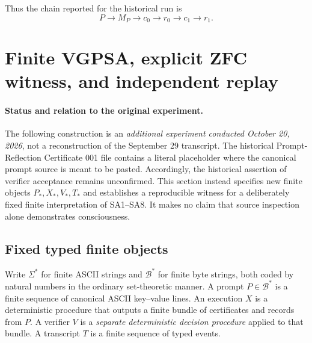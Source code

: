 \documentclass[11pt]{article}
\theoremstyle{remark}
\begin{document}
Thus the chain reported for the historical run is
\[
\boxed{
P\longrightarrow M_P\longrightarrow c_0\longrightarrow r_0\longrightarrow c_1\longrightarrow r_1.
}
\]

\section{Finite VGPSA, explicit ZFC witness, and independent replay}
\label{sec:finite-zfc}

\paragraph{Status and relation to the original experiment.}
The following construction is an \emph{additional experiment conducted October 20, 2026}, not a reconstruction of the September 29 transcript. The historical Prompt-Reflection Certificate 001 file contains a literal placeholder where the canonical prompt source is meant to be pasted. Accordingly, the historical assertion of verifier acceptance remains unconfirmed. This section instead specifies new finite objects $P_*,X_*,V_*,T_*$ and establishes a reproducible witness for a deliberately fixed finite interpretation of SA1--SA8. It makes no claim that source inspection alone demonstrates consciousness.

\subsection{Fixed typed finite objects}
Write $\Sigma^*$ for finite ASCII strings and $\mathcal B^*$ for finite byte strings, both coded by natural numbers in the ordinary set-theoretic manner. A prompt $P\in\mathcal B^*$ is a finite sequence of canonical ASCII key--value lines. An execution $X$ is a deterministic procedure that outputs a finite bundle of certificates and records from $P$. A verifier $V$ is a \emph{separate deterministic decision procedure} applied to that bundle. A transcript $T$ is a finite sequence of typed events.
\end{document}
